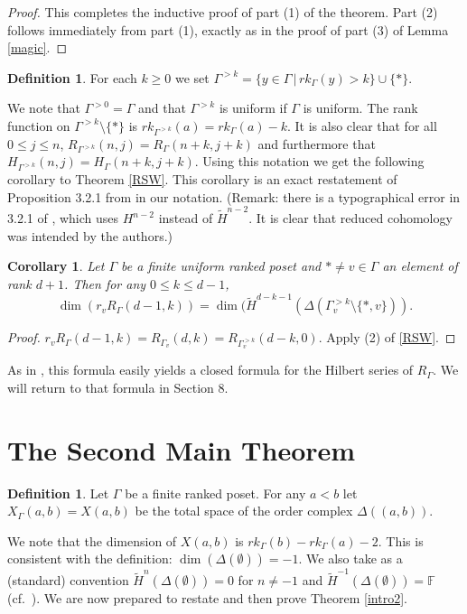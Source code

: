 \documentclass[11pt,righttag]{amsart}
\newtheorem{cor}[thm]{Corollary}
\theoremstyle{definition}
\newtheorem{defn}[thm]{Definition}
\begin{document}
\begin{proof}
This completes the inductive proof of part (1) of the theorem.  Part (2) follows immediately from part (1), exactly as in the proof of 
part (3) of Lemma \ref{magic}.
\end{proof}

\begin{defn}  For each $k\ge 0$ we set $\Gamma^{>k} = \{y\in\Gamma\,|\, rk_\Gamma(y)>k\} \cup \{*\}$.  
\end{defn}

We note that $\Gamma^{>0} = \Gamma$ and that $\Gamma^{>k}$ is uniform if 
$\Gamma$ is uniform. The rank function on 
$\Gamma^{>k}\setminus\{*\}$ is $rk_{\Gamma^{>k}}(a) = rk_\Gamma(a)-k$.   It is also clear that for all $0\le j\le n$, 
$R_{\Gamma^{>k}}(n,j) = R_\Gamma(n+k,j+k)$ and furthermore that  $H_{\Gamma^{>k}}(n,j) = H_\Gamma(n+k,j+k)$.  
Using this notation we get the following corollary to Theorem \ref{RSW}.  This corollary is an exact restatement of Proposition 3.2.1 
from \cite{RSW4} in our notation. (Remark: there is a typographical error in 3.2.1 of \cite{RSW4}, which uses $H^{n-2}$
 instead of $\tilde H^{n-2}$. It is clear that reduced cohomology was intended by the authors.)

\begin{cor}\label{dimension}  Let $\Gamma$ be a finite uniform ranked poset and $*\ne v\in \Gamma$ an element of rank $d+1$.  Then for any $0\le k\le d-1$, 
$$\dim(r_v R_\Gamma(d-1,k)) = \dim(\tilde H^{d-k-1}(\Delta(\Gamma^{>k}_v\setminus\{*,v\})).$$ 
\end{cor}

\begin{proof}
$r_vR_\Gamma(d-1,k) = R_{\Gamma_v}(d,k) = R_{\Gamma^{>k}_v}(d-k,0)$.  Apply (2) of \ref{RSW}.
\end{proof}

As in \cite{RSW4}, this formula easily yields a closed formula for the Hilbert series of $R_\Gamma$. 
We will return to that formula in Section 8. 

\section{The Second Main Theorem}

\begin{defn} Let $\Gamma$ be a finite ranked poset.  For any $a<b$ let $X_\Gamma(a,b) = X(a,b)$ be the total space of the order complex $\Delta((a,b))$.
\end{defn}

We note that the dimension of $X(a,b)$ is $rk_\Gamma(b) - rk_\Gamma(a)-2$.  This is consistent with  the definition: $\dim(\Delta(\emptyset)) = -1$.  We also 
take as a (standard) convention $\tilde H^n(\Delta(\emptyset)) = 0$ for $n\ne -1$ and $\tilde H^{-1}(\Delta(\emptyset)) = {{\mathbb F}}$ 
(cf.~\cite{Woodcock}).  We are now prepared 
to restate and then prove Theorem \ref{intro2}.
\end{document}
